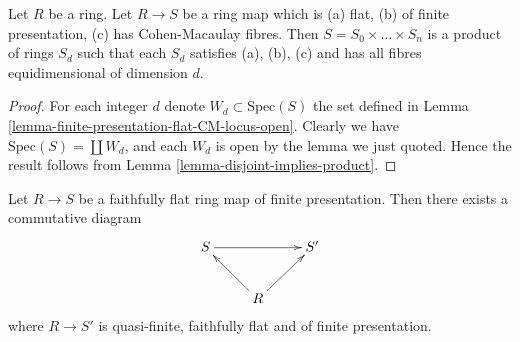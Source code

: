 \begin{lemma}
\label{lemma-relative-dimension-CM}
Let $R$ be a ring. Let $R \to S$ be a ring map
which is (a) flat, (b) of finite presentation, (c) has
Cohen-Macaulay fibres. Then $S = S_0 \times \ldots \times S_n$
is a product of rings $S_d$ such that each $S_d$ satisfies
(a), (b), (c) and has all fibres equidimensional of dimension $d$.
\end{lemma}

\begin{proof}
For each integer $d$ denote $W_d \subset \text{Spec}(S)$ the set
defined in Lemma \ref{lemma-finite-presentation-flat-CM-locus-open}.
Clearly we have $\text{Spec}(S) = \coprod W_d$, and each $W_d$
is open by the lemma we just quoted. Hence the result follows
from Lemma \ref{lemma-disjoint-implies-product}.
\end{proof}

\begin{lemma}
\label{lemma-flat-finite-presentation-CM}
Let $R \to S$ be a faithfully flat ring map of finite presentation.
Then there exists a commutative diagram
$$
\xymatrix{
S \ar[rr] & & S' \\
& R \ar[lu] \ar[ru]
}
$$
where $R \to S'$ is quasi-finite, faithfully flat and of finite presentation.
\end{lemma}

